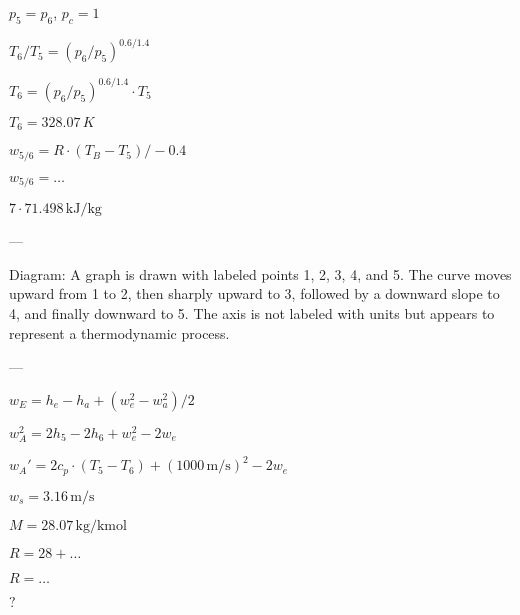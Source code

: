 \( p_5 = p_6 \), \( p_c = 1 \)  

\( T_6 / T_5 = (p_6 / p_5)^{0.6 / 1.4} \)  

\( T_6 = (p_6 / p_5)^{0.6 / 1.4} \cdot T_5 \)  

\( T_6 = 328.07 \, K \)  

\( w_{5/6} = R \cdot (T_B - T_5) / -0.4 \)  

\( w_{5/6} = \dots \)  

\( 7 \cdot 71.498 \, \text{kJ/kg} \)  

---

Diagram:  
A graph is drawn with labeled points 1, 2, 3, 4, and 5. The curve moves upward from 1 to 2, then sharply upward to 3, followed by a downward slope to 4, and finally downward to 5. The axis is not labeled with units but appears to represent a thermodynamic process.  

---

\( w_E = h_e - h_a + (w_e^2 - w_a^2) / 2 \)  

\( w_A^2 = 2h_5 - 2h_6 + w_e^2 - 2w_e \)  

\( w_A' = 2c_p \cdot (T_5 - T_6) + (1000 \, \text{m/s})^2 - 2w_e \)  

\( w_s = 3.16 \, \text{m/s} \)  

\( M = 28.07 \, \text{kg/kmol} \)  

\( R = 28 + \dots \)  

\( R = \dots \)  

\( ? \)